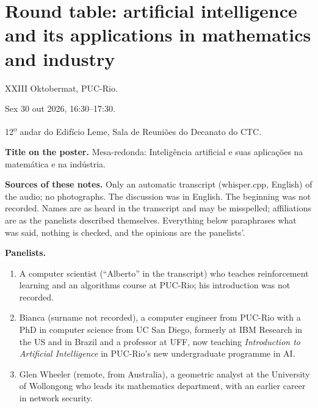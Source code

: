\section{Round table: artificial intelligence and its applications in mathematics and industry}
\label{section-oktobermat-ai-round-table}

\noindent
XXIII Oktobermat, PUC-Rio.

Sex 30 out 2026, 16:30--17:30.

12\textsuperscript{o} andar do Edif\'icio
Leme, Sala de Reuni\~oes do Decanato do CTC.

\medskip\noindent
{\bf Title on the poster.} Mesa-redonda:
Intelig\^encia artificial e suas
aplica\c{c}\~oes na matem\'atica e na
ind\'ustria.

\medskip\noindent
{\bf Sources of these notes.} Only an
automatic transcript (whisper.cpp, English)
of the audio; no photographs. The discussion
was in English. The beginning was not
recorded. Names are as heard in the
transcript and may be misspelled;
affiliations are as the panelists described
themselves. Everything below paraphrases
what was said, nothing is checked, and the
opinions are the panelists'.

\medskip\noindent
{\bf Panelists.}
\begin{enumerate}
\item A computer scientist (``Alberto'' in
the transcript) who teaches reinforcement
learning and an algorithms course at
PUC-Rio; his introduction was not recorded.
\item Bianca (surname not recorded), a
computer engineer from PUC-Rio with a PhD
in computer science from UC San Diego,
formerly at IBM Research in the US and in
Brazil and a professor at UFF, now teaching
\emph{Introduction to Artificial
Intelligence} in PUC-Rio's new
undergraduate programme in AI.
\item Glen Wheeler (remote, from
Australia), a geometric analyst at the
University of Wollongong who leads its
mathematics department, with an earlier
career in network security.
\end{enumerate}

